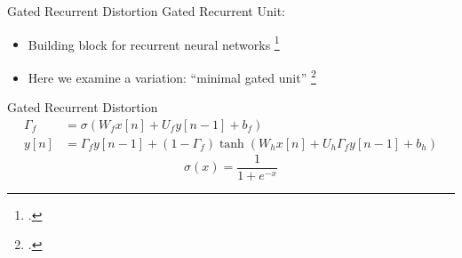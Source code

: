 \begin{frame}
\end{frame}

\begin{frame}{Gated Recurrent Distortion}
    Gated Recurrent Unit:
    \vspace{3ex}
    \begin{itemize}
        \item Building block for recurrent neural networks \footcite{gru_original}
        \item Here we examine a variation: ``minimal gated unit'' \footcite{minimal-gated-unit}
    \end{itemize}
\end{frame}

\begin{frame}{Gated Recurrent Distortion}
    \begin{equation}
        \begin{split}
            \Gamma_f &= \sigma (W_f x[n] + U_f y[n-1] + b_f) \\
            y[n] &= \Gamma_f y[n-1] + (1 - \Gamma_f) \tanh (W_h x[n] + U_h \Gamma_f y[n-1] + b_h)
        \end{split}
    \end{equation}
    \vspace{3ex}
    \begin{equation}
        \sigma(x) = \frac{1}{1 + e^{-x}}
        \label{eq:sigmoid}
    \end{equation}
\end{frame}

